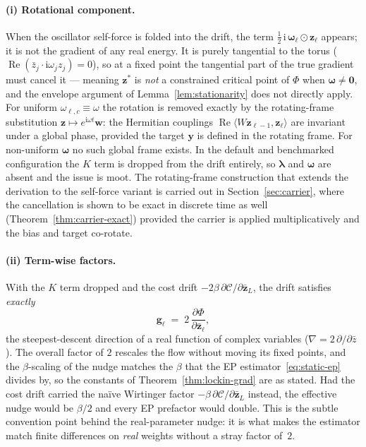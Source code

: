 \documentclass[11pt]{article}
\newcommand{\im}{\mathrm{i}}
\theoremstyle{definition}
\DeclareMathOperator{\Real}{Re}
\begin{document}
\paragraph{(i) Rotational component.}
When the oscillator self-force is folded into the drift, the term
$\tfrac12\,\im\,\bm{\omega}_\ell\odot\bm{z}_\ell$ appears; it is not the
gradient of any real energy.  It is purely tangential to the torus
($\Real(\bar z_j\cdot\im\omega_j z_j)=0$), so at a fixed point the
tangential part of the true gradient must cancel it --- meaning
$\bm{z}^*$ is \emph{not} a constrained critical point of $\Phi$ when
$\bm{\omega}\ne\bm{0}$, and the envelope argument of
Lemma~\ref{lem:stationarity} does not directly apply.  For uniform
$\omega_{\ell,c}\equiv\omega$ the rotation is removed exactly by the
rotating-frame substitution $\bm{z}\mapsto e^{\im\omega t}\bm{w}$: the
Hermitian couplings $\Real\langle W\bm{z}_{\ell-1},\bm{z}_\ell\rangle$
are invariant under a global phase, provided the target $\bm{y}$ is
defined in the rotating frame.  For non-uniform $\bm{\omega}$ no such
global frame exists.  In the default and benchmarked configuration the
$K$ term is dropped from the drift entirely, so $\bm{\lambda}$ and
$\bm{\omega}$ are absent and the issue is moot.  The rotating-frame
construction that extends the derivation to the self-force variant is
carried out in Section~\ref{sec:carrier}, where the cancellation is
shown to be exact in discrete time as well
(Theorem~\ref{thm:carrier-exact}) provided the carrier is applied
multiplicatively and the bias and target co-rotate.

\paragraph{(ii) Term-wise factors.}
With the $K$ term dropped and the cost drift
$-2\beta\,\partial\mathcal{C}/\partial\bar{\bm{z}}_L$, the drift
satisfies \emph{exactly}
\begin{equation}\label{eq:drift-is-2grad}
  \bm{g}_\ell \;=\; 2\,\frac{\partial\Phi}{\partial\bar{\bm{z}}_\ell},
\end{equation}
the steepest-descent direction of a real function of complex variables
($\nabla = 2\,\partial/\partial\bar z$).  The overall factor of $2$
rescales the flow without moving its fixed points, and the
$\beta$-scaling of the nudge matches the $\beta$ that the EP
estimator~\eqref{eq:static-ep} divides by, so the constants of
Theorem~\ref{thm:lockin-grad} are as stated.  Had the cost drift
carried the na\"ive Wirtinger factor
$-\beta\,\partial\mathcal{C}/\partial\bar{\bm{z}}_L$ instead, the
effective nudge would be $\beta/2$ and every EP prefactor would double.
This is the subtle convention point behind the real-parameter nudge: it
is what makes the estimator match finite differences on \emph{real}
weights without a stray factor of~$2$.
\end{document}

